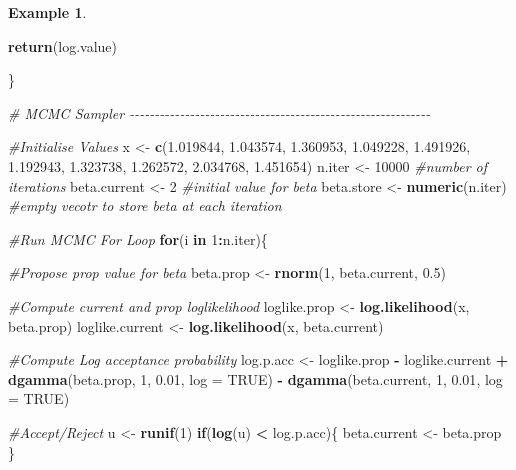 \documentclass[
]{book}
\newenvironment{Shaded}{\begin{snugshade}}{\end{snugshade}}
\newcommand{\AttributeTok}[1]{\textcolor[rgb]{0.13,0.29,0.53}{#1}}
\newcommand{\CommentTok}[1]{\textcolor[rgb]{0.56,0.35,0.01}{\textit{#1}}}
\newcommand{\ConstantTok}[1]{\textcolor[rgb]{0.56,0.35,0.01}{#1}}
\newcommand{\ControlFlowTok}[1]{\textcolor[rgb]{0.13,0.29,0.53}{\textbf{#1}}}
\newcommand{\DecValTok}[1]{\textcolor[rgb]{0.00,0.00,0.81}{#1}}
\newcommand{\FloatTok}[1]{\textcolor[rgb]{0.00,0.00,0.81}{#1}}
\newcommand{\FunctionTok}[1]{\textcolor[rgb]{0.13,0.29,0.53}{\textbf{#1}}}
\newcommand{\NormalTok}[1]{#1}
\newcommand{\OtherTok}[1]{\textcolor[rgb]{0.56,0.35,0.01}{#1}}
\newcommand{\SpecialCharTok}[1]{\textcolor[rgb]{0.81,0.36,0.00}{\textbf{#1}}}
\theoremstyle{definition}
\theoremstyle{definition}
\newtheorem{example}{Example}[chapter]
\theoremstyle{definition}
\theoremstyle{definition}
\theoremstyle{remark}
\begin{document}
\begin{example}
\begin{Shaded}
\begin{Highlighting}[]
  \FunctionTok{return}\NormalTok{(log.value)}

\NormalTok{\}}

\CommentTok{\# MCMC Sampler {-}{-}{-}{-}{-}{-}{-}{-}{-}{-}{-}{-}{-}{-}{-}{-}{-}{-}{-}{-}{-}{-}{-}{-}{-}{-}{-}{-}{-}{-}{-}{-}{-}{-}{-}{-}{-}{-}{-}{-}{-}{-}{-}{-}{-}{-}{-}{-}{-}{-}{-}{-}{-}{-}{-}{-}{-}{-}{-}{-}}

\CommentTok{\#Initialise Values}
\NormalTok{x }\OtherTok{\textless{}{-}} \FunctionTok{c}\NormalTok{(}\FloatTok{1.019844}\NormalTok{, }\FloatTok{1.043574}\NormalTok{, }\FloatTok{1.360953}\NormalTok{, }\FloatTok{1.049228}\NormalTok{, }\FloatTok{1.491926}\NormalTok{, }\FloatTok{1.192943}\NormalTok{, }\FloatTok{1.323738}\NormalTok{, }\FloatTok{1.262572}\NormalTok{, }\FloatTok{2.034768}\NormalTok{, }\FloatTok{1.451654}\NormalTok{)}
\NormalTok{n.iter }\OtherTok{\textless{}{-}} \DecValTok{10000} \CommentTok{\#number of iterations}
\NormalTok{beta.current }\OtherTok{\textless{}{-}} \DecValTok{2} \CommentTok{\#initial value for beta}
\NormalTok{beta.store }\OtherTok{\textless{}{-}} \FunctionTok{numeric}\NormalTok{(n.iter) }\CommentTok{\#empty vecotr to store beta at each iteration}

\CommentTok{\#Run MCMC For Loop}
\ControlFlowTok{for}\NormalTok{(i }\ControlFlowTok{in} \DecValTok{1}\SpecialCharTok{:}\NormalTok{n.iter)\{}

  \CommentTok{\#Propose prop value for beta}
\NormalTok{  beta.prop }\OtherTok{\textless{}{-}} \FunctionTok{rnorm}\NormalTok{(}\DecValTok{1}\NormalTok{, beta.current, }\FloatTok{0.5}\NormalTok{)}

  \CommentTok{\#Compute current and prop loglikelihood}
\NormalTok{  loglike.prop     }\OtherTok{\textless{}{-}} \FunctionTok{log.likelihood}\NormalTok{(x, beta.prop)}
\NormalTok{  loglike.current }\OtherTok{\textless{}{-}} \FunctionTok{log.likelihood}\NormalTok{(x, beta.current)}

  \CommentTok{\#Compute Log acceptance probability}
\NormalTok{  log.p.acc }\OtherTok{\textless{}{-}}\NormalTok{ loglike.prop }\SpecialCharTok{{-}}\NormalTok{ loglike.current }\SpecialCharTok{+}
    \FunctionTok{dgamma}\NormalTok{(beta.prop, }\DecValTok{1}\NormalTok{, }\FloatTok{0.01}\NormalTok{, }\AttributeTok{log =} \ConstantTok{TRUE}\NormalTok{) }\SpecialCharTok{{-}} \FunctionTok{dgamma}\NormalTok{(beta.current, }\DecValTok{1}\NormalTok{, }\FloatTok{0.01}\NormalTok{, }\AttributeTok{log =} \ConstantTok{TRUE}\NormalTok{)}

  \CommentTok{\#Accept/Reject}
\NormalTok{  u }\OtherTok{\textless{}{-}} \FunctionTok{runif}\NormalTok{(}\DecValTok{1}\NormalTok{)}
  \ControlFlowTok{if}\NormalTok{(}\FunctionTok{log}\NormalTok{(u) }\SpecialCharTok{\textless{}}\NormalTok{ log.p.acc)\{}
\NormalTok{    beta.current }\OtherTok{\textless{}{-}}\NormalTok{ beta.prop}
\NormalTok{  \}}


\end{Highlighting}
\end{Shaded}
\end{example}
\end{document}
